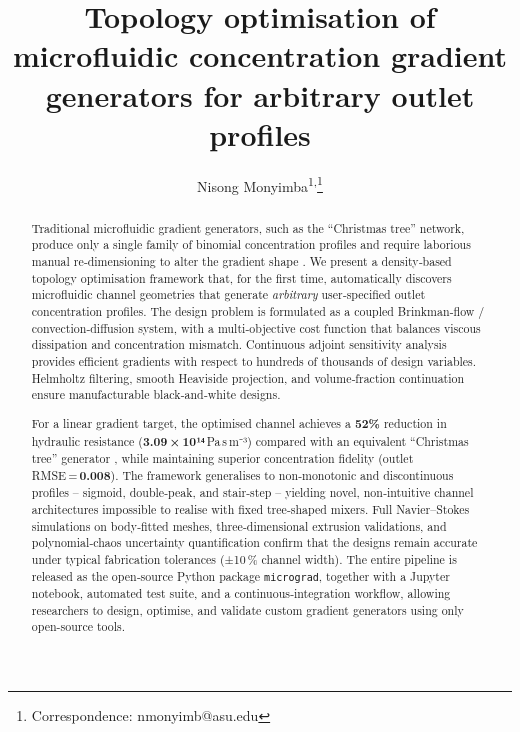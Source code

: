 \documentclass[12pt]{article}
\title{Topology optimisation of microfluidic concentration gradient generators for arbitrary outlet profiles}
\author{Nisong Monyimba\textsuperscript{1,}\thanks{Correspondence: nmonyimb@asu.edu}}
\date{}
\begin{document}
\maketitle

\begin{abstract}
Traditional microfluidic gradient generators, such as the ``Christmas tree'' network, produce only a single family of binomial concentration profiles and require laborious manual re‑dimensioning to alter the gradient shape \cite{jeon2005}. We present a density‑based topology optimisation framework that, for the first time, automatically discovers microfluidic channel geometries that generate \textit{arbitrary} user‑specified outlet concentration profiles. The design problem is formulated as a coupled Brinkman‑flow / convection‑diffusion system, with a multi‑objective cost function that balances viscous dissipation and concentration mismatch. Continuous adjoint sensitivity analysis provides efficient gradients with respect to hundreds of thousands of design variables. Helmholtz filtering, smooth Heaviside projection, and volume‑fraction continuation ensure manufacturable black‑and‑white designs.

For a linear gradient target, the optimised channel achieves a \textbf{52\%} reduction in hydraulic resistance (\textbf{3.09 × 10¹⁴} Pa s m⁻³) compared with an equivalent ``Christmas tree'' generator \cite{jeon2005}, while maintaining superior concentration fidelity (outlet RMSE = \textbf{0.008}). The framework generalises to non‑monotonic and discontinuous profiles – sigmoid, double‑peak, and stair‑step – yielding novel, non‑intuitive channel architectures impossible to realise with fixed tree‑shaped mixers. Full Navier–Stokes simulations on body‑fitted meshes, three‑dimensional extrusion validations, and polynomial‑chaos uncertainty quantification confirm that the designs remain accurate under typical fabrication tolerances (±10 \% channel width). The entire pipeline is released as the open‑source Python package \texttt{micrograd}, together with a Jupyter notebook, automated test suite, and a continuous‑integration workflow, allowing researchers to design, optimise, and validate custom gradient generators using only open-source tools.
\end{abstract}

\end{document}
